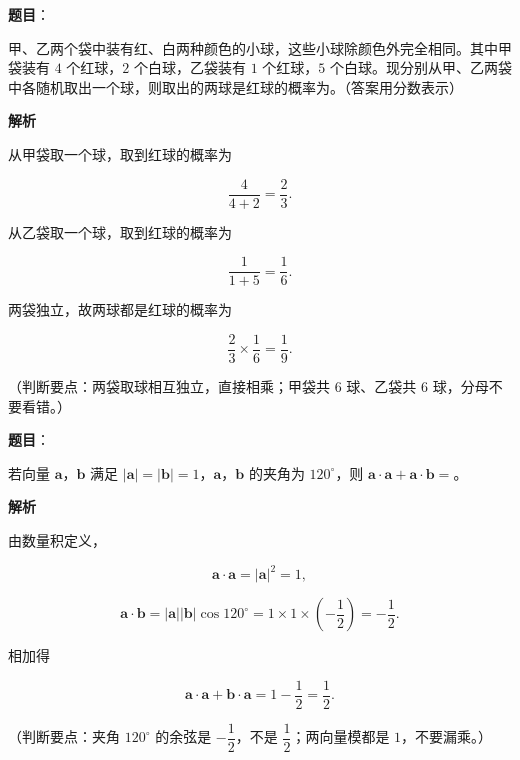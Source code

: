\begin{answer}

\textbf{题目}：

甲、乙两个袋中装有红、白两种颜色的小球，这些小球除颜色外完全相同。其中甲袋装有 $4$ 个红球，$2$ 个白球，乙袋装有 $1$ 个红球，$5$ 个白球。现分别从甲、乙两袋中各随机取出一个球，则取出的两球是红球的概率为\gkblank{}。（答案用分数表示）

\textbf{解析}

从甲袋取一个球，取到红球的概率为

\nopagebreak[4]
\[\frac{4}{4+2}=\frac23.\]

从乙袋取一个球，取到红球的概率为

\nopagebreak[4]
\[\frac{1}{1+5}=\frac16.\]

两袋独立，故两球都是红球的概率为

\nopagebreak[4]
\[\frac23\times\frac16=\frac19.\]

（判断要点：两袋取球相互独立，直接相乘；甲袋共 $6$ 球、乙袋共 $6$ 球，分母不要看错。）


\end{answer}
\begin{answer}

\textbf{题目}：

若向量 $\boldsymbol a$，$\boldsymbol b$ 满足 $|\boldsymbol a|=|\boldsymbol b|=1$，$\boldsymbol a$，$\boldsymbol b$ 的夹角为 $120^\circ$，则 $\boldsymbol a\cdot\boldsymbol a+\boldsymbol a\cdot\boldsymbol b=$\gkblank{}。

\textbf{解析}

由数量积定义，

\nopagebreak[4]
\[\boldsymbol a\cdot\boldsymbol a=|\boldsymbol a|^2=1,\]

\nopagebreak[4]
\[\boldsymbol a\cdot\boldsymbol b=|\boldsymbol a||\boldsymbol b|\cos120^\circ=1\times1\times\left(-\frac12\right)=-\frac12.\]

相加得

\nopagebreak[4]
\[\boldsymbol a\cdot\boldsymbol a+\boldsymbol b\cdot\boldsymbol a=1-\frac12=\frac12.\]

（判断要点：夹角 $120^\circ$ 的余弦是 $-\dfrac12$，不是 $\dfrac12$；两向量模都是 $1$，不要漏乘。）


\end{answer}
